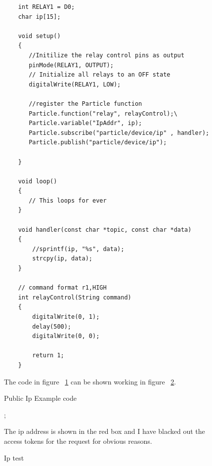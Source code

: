 \documentclass{article}
\begin{document}
\begin{figure}[h]
    \begin{lstlisting}
    int RELAY1 = D0;
    char ip[15];

    void setup()
    {
       //Initilize the relay control pins as output
       pinMode(RELAY1, OUTPUT);
       // Initialize all relays to an OFF state
       digitalWrite(RELAY1, LOW);

       //register the Particle function
       Particle.function("relay", relayControl);\
       Particle.variable("IpAddr", ip);
       Particle.subscribe("particle/device/ip" , handler);
       Particle.publish("particle/device/ip");

    }

    void loop()
    {
       // This loops for ever
    }

    void handler(const char *topic, const char *data)
    {
        //sprintf(ip, "%s", data);
        strcpy(ip, data);
    }

    // command format r1,HIGH
    int relayControl(String command)
    {
        digitalWrite(0, 1);
        delay(500);
        digitalWrite(0, 0);

        return 1;
    }
    \end{lstlisting}
    \caption{Public Ip Example code} \label{fig:publicIpExample}
    \vspace{0.5cm}
    The code in figure ~\ref{fig:publicIpExample} can be shown working in figure ~\ref{fig:ipTest}.
\end{figure}


\begin{figure}[h]
    \noindent{};
    \caption{Ip test} \label{fig:ipTest}
    The ip address is shown in the red box and I have blacked out the access tokens for the request
    for obvious reasons.
\end{figure}
\end{document}
